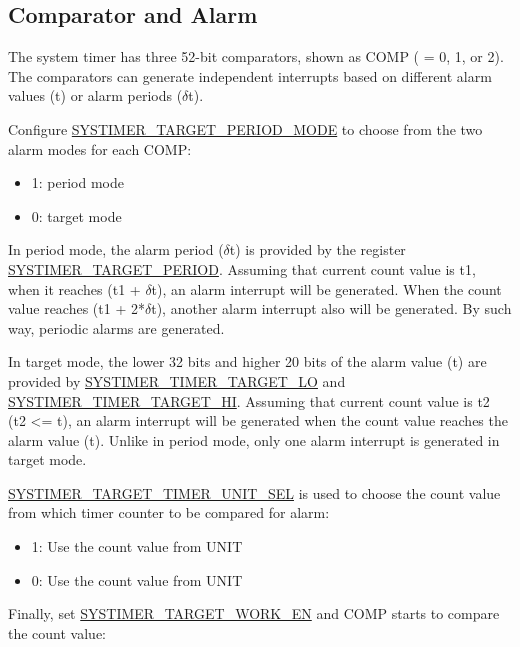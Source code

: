 \documentclass[main\_\_EN.tex]{subfiles}
\begin{document}
\subsection{Comparator and Alarm}
The system timer has three 52-bit comparators, shown as COMP ( = 0, 1, or 2). The comparators can generate independent interrupts based on different alarm values (t) or alarm periods ($\delta$t).

Configure \hyperref[fielddesc:SYSTIMERTARGET0PERIODMODE]{SYSTIMER\_TARGET\_PERIOD\_MODE} to choose from the two alarm modes for each COMP:
\begin{itemize}
    \item 1: period mode
    \item 0: target mode
\end{itemize}

In period mode, the alarm period ($\delta$t) is provided by the register \hyperref[fielddesc:SYSTIMERTARGET2PERIOD]{SYSTIMER\_TARGET\_PERIOD}. Assuming that current count value is t1, when it reaches (t1 + $\delta$t), an alarm interrupt will be generated. When the count value reaches (t1 + 2*$\delta$t), another alarm interrupt also will be generated. By such way, periodic alarms are generated.

In target mode, the lower 32 bits and higher 20 bits of the alarm value (t) are provided by  \hyperref[fielddesc:SYSTIMERTIMERTARGET0LO]{SYSTIMER\_TIMER\_TARGET\_LO} and \hyperref[fielddesc:SYSTIMERTIMERTARGET0HI]{SYSTIMER\_TIMER\_TARGET\_HI}. Assuming that current count value is t2 (t2 <= t), an alarm interrupt will be generated when the count value reaches the alarm value (t). Unlike in period mode, only one alarm interrupt is generated in target mode.

\hyperref[fielddesc:SYSTIMERTARGET0TIMERUNITSEL]{SYSTIMER\_TARGET\_TIMER\_UNIT\_SEL} is used to choose the count value from which timer counter to be compared for alarm:

\begin{itemize}
        \item 1: Use the count value from UNIT
        \item 0: Use the count value from UNIT
\end{itemize}

Finally, set \hyperref[fielddesc:SYSTIMERTARGET0WORKEN]{SYSTIMER\_TARGET\_WORK\_EN} and COMP starts to compare the count value:
\end{document}
